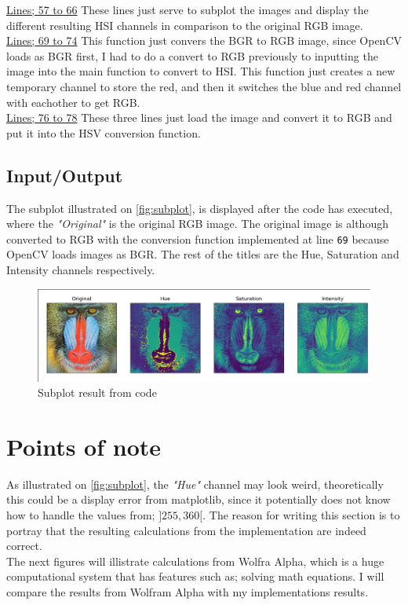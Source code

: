\documentclass{article}
\begin{document}
\underline{Lines; 57 to 66}
These lines just serve to subplot the images and display the different resulting HSI channels in comparison to the original RGB image.\medskip \\
\underline{Lines; 69 to 74}
This function just convers the BGR to RGB image, since OpenCV loads as BGR first, I had to do a convert to RGB previously to inputting the image into the main function to convert to HSI. This function just creates a new temporary channel to store the red, and then it switches the blue and red channel with eachother to get RGB.\\
\underline{Lines; 76 to 78}
These three lines just load the image and convert it to RGB and put it into the HSV conversion function.\\

\subsection{Input/Output}
The subplot illustrated on \autoref{fig:subplot}, is displayed after the code has executed, where the \textit{"Original"} is the original RGB image. The original image is although converted to RGB with the conversion function implemented at line \texttt{69} because OpenCV loads images as BGR. The rest of the titles are the Hue, Saturation and Intensity channels respectively.
\begin{figure}[H]
    \centering
    \includegraphics[width=\textwidth]{img/output.png}
    \caption{Subplot result from code}
    \label{fig:subplot}
\end{figure}
\section{Points of note}
As illustrated on \autoref{fig:subplot}, the \textit{"Hue"} channel may look weird, theoretically this could be a display error from matplotlib, since it potentially does not know how to handle the values from; $]255, 360 [$. The reason for writing this section is to portray that the resulting calculations from the implementation are indeed correct.\\
The next figures will illistrate calculations from Wolfra Alpha, which is a huge computational system that has features such as; solving math equations. I will compare the results from Wolfram Alpha with my implementations results.
\end{document}
